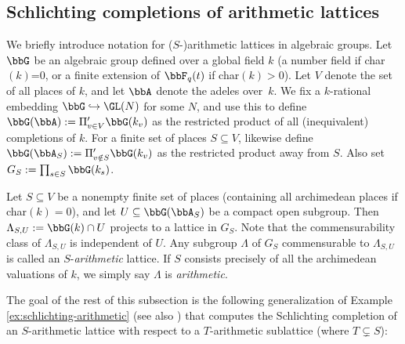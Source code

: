 \subsection{Schlichting completions of arithmetic lattices}\label{sec:notation-arithmetic} We briefly introduce notation for ($S$-)arithmetic lattices in algebraic groups. Let $\bbG$ be an algebraic group defined over a global field $k$ (\ie a number field if char$(k)$=0, or a finite extension of $\bbF_q(t)$ if char$(k)>0$). Let $V$ denote the set of all places of $k$, and let $\bbA$ denote the adeles over~$k$. We fix a $k$-rational embedding $\bbG\hookrightarrow \GL(N)$ for some $N$, and use this to define $\bbG(\bbA):=\Pi'_{v\in V} \bbG(k_v)$ as the restricted product of all (inequivalent) completions of $k$. For a finite set of places $S\subseteq V$, likewise define $\bbG(\bbA_S):=\Pi'_{v\notin S} \bbG(k_v)$ as the restricted product away from $S$. Also set $G_S:=\prod_{s\in S} \bbG(k_s)$.

Let $S\subseteq V$ be a nonempty finite set of places (containing all archimedean places if char$(k)=0$), and let $U\subseteq \bbG(\bbA_S)$ be a compact open subgroup. Then $\Lambda_{S,U}:=\bbG(k)\cap U$ projects to a lattice in $G_S$. Note that the commensurability class of $\Lambda_{S,U}$ is independent of $U$. Any subgroup $\Lambda$ of $G_S$ commensurable to $\Lambda_{S,U}$ is called an $S$\nobreakdash-\emph{arithmetic} lattice. If $S$ consists precisely of all the archimedean valuations of $k$, we simply say $\Lambda$ is \emph{arithmetic}.

The goal of the rest of this subsection is the following generalization of Example \ref{ex:schlichting-arithmetic} (see also \cite[3.11]{shalom-willis}) that computes the Schlichting completion of an $S$-arithmetic lattice with respect to a $T$-arithmetic sublattice (where $T\subsetneq S$):

